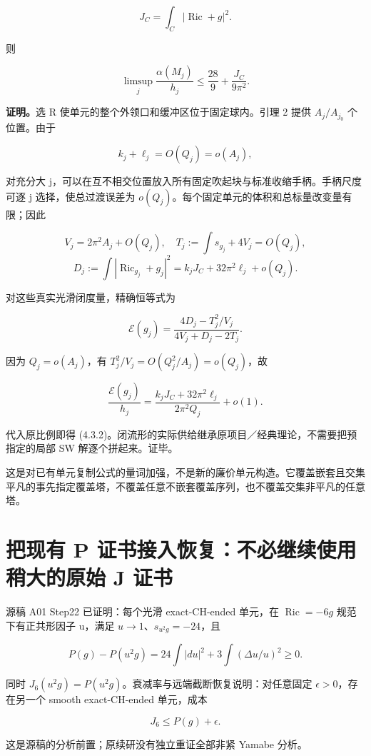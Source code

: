 \documentclass[UTF8,11pt,fontset=none]{ctexart}
\theoremstyle{definition}
\theoremstyle{remark}
\begin{document}
\[
J_C=\int_C|\operatorname{Ric}+g|^2.
\]

则

\[
\boxed{\limsup_j\frac{\alpha(M_j)}{h_j}
\le\frac{28}{9}+\frac{J_C}{9\pi^2}.}
\tag{4.3.2}
\]

\textbf{证明。}选 R 使单元的整个外领口和缓冲区位于固定球内。引理 2 提供 \(A_j/A_{j_0}\) 个位置。由于

\[
k_j+\ell_j=O(Q_j)=o(A_j),
\]

对充分大 j，可以在互不相交位置放入所有固定吹起块与标准收缩手柄。手柄尺度可逐 j 选择，使总过渡误差为 \(o(Q_j)\)。每个固定单元的体积和总标量改变量有限；因此

\[
V_j=2\pi^2A_j+O(Q_j),\quad
T_j:=\int s_{g_j}+4V_j=O(Q_j),
\] \[
D_j:=\int|\operatorname{Ric}_{g_j}+g_j|^2
=k_jJ_C+32\pi^2\ell_j+o(Q_j).
\]

对这些真实光滑闭度量，精确恒等式为

\[
\mathcal E(g_j)=
\frac{4D_j-T_j^2/V_j}{4V_j+D_j-2T_j}.
\tag{4.3.3}
\]

因为 \(Q_j=o(A_j)\)，有 \(T_j^2/V_j=O(Q_j^2/A_j)=o(Q_j)\)，故

\[
\frac{\mathcal E(g_j)}{h_j}
=\frac{k_jJ_C+32\pi^2\ell_j}{2\pi^2Q_j}+o(1).
\]

代入原比例即得 (4.3.2)。闭流形的实际供给继承原项目／经典理论，不需要把预指定的局部 SW 解逐个拼起来。证毕。

这是对已有单元复制公式的量词加强，不是新的廉价单元构造。它覆盖嵌套且交集平凡的事先指定覆盖塔，不覆盖任意不嵌套覆盖序列，也不覆盖交集非平凡的任意塔。

\section{把现有 P 证书接入恢复：不必继续使用稍大的原始 J 证书}\label{v4-ux628aux73b0ux6709-p-ux8bc1ux4e66ux63a5ux5165ux6062ux590dux4e0dux5fc5ux7ee7ux7eedux4f7fux7528ux7a0dux5927ux7684ux539fux59cb-j-ux8bc1ux4e66}

源稿 A01 Step22 已证明：每个光滑 exact-CH-ended 单元，在 \(\operatorname{Ric}=-6g\) 规范下有正共形因子 u，满足 \(u\to1\)、\(s_{u^2g}=-24\)，且

\[
P(g)-P(u^2g)
=24\int|du|^2+3\int(\Delta u/u)^2\ge0.
\]

同时 \(J_6(u^2g)=P(u^2g)\)。衰减率与远端截断恢复说明：对任意固定 \(\epsilon>0\)，存在另一个 smooth exact-CH-ended 单元，成本

\[
J_6\le P(g)+\epsilon.
\tag{4.4.1}
\]

这是源稿的分析前置；原续研没有独立重证全部非紧 Yamabe 分析。
\end{document}
